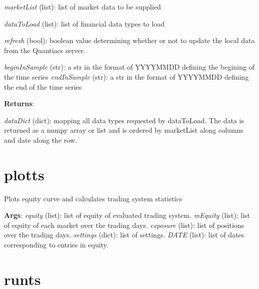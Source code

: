 \documentclass[letterpaper,10pt,english]{sphinxmanual}
\begin{document}
\emph{marketList} (list): list of market data to be supplied

\emph{dataToLoad} (list): list of financial data types to load

\emph{refresh} (bool): boolean value determining whether or not to update the local data from the Quantiacs server.

\emph{beginInSample} (str): a str in the format of YYYYMMDD defining the
begining of the time series
\emph{endInSample} (str): a str in the format of YYYYMMDD defining the end of the time series

\textbf{Returns}:

\emph{dataDict} (dict): mapping all data types requested by dataToLoad. The data is returned as a numpy array or list and is ordered by marketList along columns and date along the row.


\section{plotts}
\label{reference:plotts}

\begin{fulllineitems}
\label{reference:quantiacsToolbox.plotts}
\end{fulllineitems}


Plots equity curve and calculates trading system statistics

\textbf{Args}:
\emph{equity} (list): list of equity of evaluated trading system.
\emph{mEquity} (list): list of equity of each market over the trading days.
\emph{exposure} (list): list of positions over the trading days.
\emph{settings} (dict): list of settings.
\emph{DATE} (list): list of dates corresponding to entries in equity.


\section{runts}
\label{reference:runts}

\begin{fulllineitems}
\label{reference:quantiacsToolbox.runts}
\end{fulllineitems}
\end{document}
